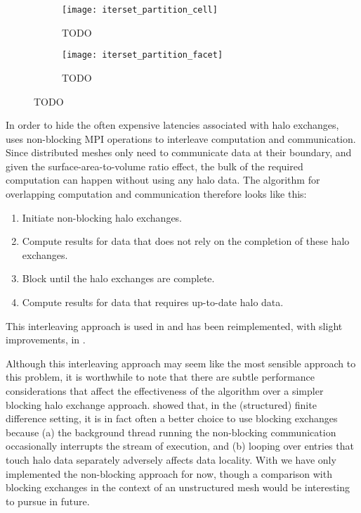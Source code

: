 \documentclass[thesis]{subfiles}
\begin{document}

\begin{figure}
  \begin{subfigure}{\textwidth}
    \texttt{[image: iterset\_partition\_cell]}
    \caption{TODO}
    \label{fig:iterset_partition_cell}
  \end{subfigure}
  \begin{subfigure}{\textwidth}
    \texttt{[image: iterset\_partition\_facet]}
    \caption{TODO}
    \label{fig:iterset_partition_facet}
  \end{subfigure}
  \caption{TODO}
  \label{fig:iterset_partition}
\end{figure}

In order to hide the often expensive latencies associated with halo exchanges,  uses non-blocking MPI operations to interleave computation and communication.
Since distributed meshes only need to communicate data at their boundary, and given the surface-area-to-volume ratio effect, the bulk of the required computation can happen without using any halo data.
The algorithm for overlapping computation and communication therefore looks like this:

\begin{enumerate}
  \item Initiate non-blocking halo exchanges.
  \item Compute results for data that does not rely on the completion of these halo exchanges.
  \item Block until the halo exchanges are complete.
  \item Compute results for data that requires up-to-date halo data.
\end{enumerate}

This interleaving approach is used in  and has been reimplemented, with slight improvements, in .

Although this interleaving approach may seem like the most sensible approach to this problem, it is worthwhile to note that there are subtle performance considerations that affect the effectiveness of the algorithm over a simpler blocking halo exchange approach.
\cite{bisbasAutomatedMPICode2023} showed that, in the (structured) finite difference setting, it is in fact often a better choice to use blocking exchanges because
(a) the background thread running the non-blocking communication occasionally interrupts the stream of execution, and
(b) looping over entries that touch halo data separately adversely affects data locality.
With  we have only implemented the non-blocking approach for now, though a comparison with blocking exchanges in the context of an unstructured mesh would be interesting to pursue in future.
\end{document}
